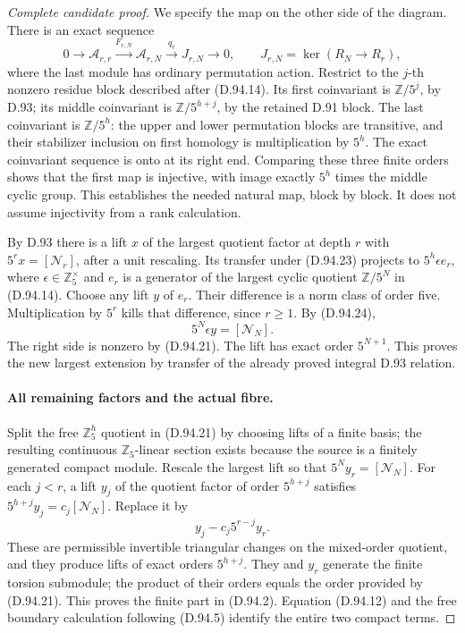 \begin{proof}[Complete candidate proof]
We specify the map on the other side of the diagram.
There is an exact sequence
\[
 0\longrightarrow\mathscr A_{r,r}
 \xrightarrow{F_{r,N}}\mathscr A_{r,N}
 \xrightarrow{q_r}J_{r,N}\longrightarrow0,
       \qquad J_{r,N}=\ker(R_N\to R_r),
                                                        \tag{D.94.25}
\]
where the last module has ordinary permutation action.
Restrict to the \(j\)-th nonzero residue block described
after (D.94.14). Its first coinvariant is
\(\mathbb Z/5^j\), by D.93; its middle coinvariant is
\(\mathbb Z/5^{h+j}\), by the retained D.91 block.
The last coinvariant is \(\mathbb Z/5^h\): the upper
and lower permutation blocks are transitive, and their
stabilizer inclusion on first homology is multiplication
by \(5^h\). The exact coinvariant sequence is onto at
its right end. Comparing these three finite orders shows
that the first map is injective, with image exactly
\(5^h\) times the middle cyclic group. This establishes
the needed natural map, block by block. It does not assume
injectivity from a rank calculation.

By D.93 there is a lift \(x\) of the largest quotient
factor at depth \(r\) with
\(5^r x=[\mathcal N_r]\), after a unit rescaling.
Its transfer under (D.94.23) projects to \(5^h\epsilon e_r\),
where \(\epsilon\in\mathbb Z_5^\times\) and \(e_r\)
is a generator of the largest cyclic quotient
\(\mathbb Z/5^N\) in (D.94.14). Choose any lift \(y\)
of \(e_r\). Their difference is a norm class of order
five. Multiplication by \(5^r\) kills that difference,
since \(r\ge1\). By (D.94.24),
\[
                         5^N\epsilon y=[\mathcal N_N].
                                                        \tag{D.94.26}
\]
The right side is nonzero by (D.94.21). The lift has exact
order \(5^{N+1}\). This proves the new largest extension
by transfer of the already proved integral D.93 relation.

\paragraph{All remaining factors and the actual fibre.}
Split the free \(\mathbb Z_5^h\) quotient in (D.94.21)
by choosing lifts of a finite basis; the resulting continuous
\(\mathbb Z_5\)-linear section exists because the source
is a finitely generated compact module. Rescale the largest
lift so that \(5^N y_r=[\mathcal N_N]\). For each
\(j<r\), a lift \(y_j\) of the quotient factor of order
\(5^{h+j}\) satisfies
\(5^{h+j}y_j=c_j[\mathcal N_N]\). Replace it by
\[
                           y_j-c_j5^{r-j}y_r.
                                                        \tag{D.94.27}
\]
These are permissible invertible triangular changes on the
mixed-order quotient, and they produce lifts of exact orders
\(5^{h+j}\). They and \(y_r\) generate the finite torsion
submodule; the product of their orders equals the order
provided by (D.94.21). This proves the finite part in
(D.94.2). Equation (D.94.12) and the free boundary calculation
following (D.94.5) identify the entire two compact terms.


\end{proof}
